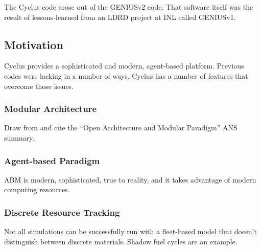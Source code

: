 The Cyclus code arose out of the GENIUSv2 code. That software itself was the 
result of lessons-learned from an LDRD project at INL called GENIUSv1. 


\subsection{Motivation}

Cyclus provides a sophisticated and modern, agent-based platform. Previous 
codes were lacking in a number of ways. Cyclus has a number of features that 
overcome those issues.  

\subsubsection{Modular Architecture}

Draw from and cite the ``Open Architecture and Modular Paradigm'' ANS summary.

\subsubsection{Agent-based Paradigm}

ABM is modern, sophisticated, true to reality, and it takes advantage of modern 
computing resources. 


\subsubsection{Discrete Resource Tracking}

Not all simulations can be successfully run with a fleet-based model that 
doesn't distinguish between discrete materials. Shadow fuel cycles are an 
example. 

